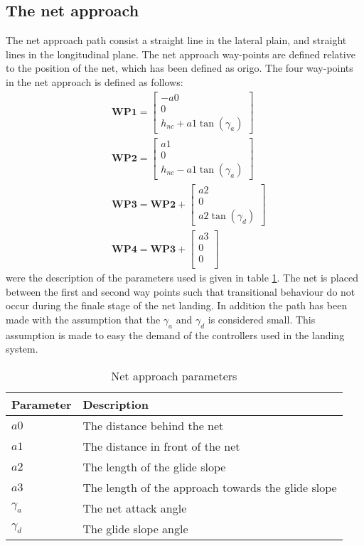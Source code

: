\subsection{The net approach}
The net approach path consist a straight line in the lateral plain, and straight lines in the longitudinal plane. The net approach way-points are defined relative to the position of the net, which has been defined as origo. The four way-points in the net approach is defined as follows:
\begin{subequations}
\begin{align}
&\mathbf{WP1} = 
\begin{bmatrix}
-a0 \\
0 \\
h_{nc} + a1\tan(\gamma_a) 
\end{bmatrix}\\
&\mathbf{WP2} = 
\begin{bmatrix}
a1 \\
0 \\
h_{nc} - a1\tan(\gamma_a)
\end{bmatrix}\\
&\mathbf{WP3} = \mathbf{WP2} + 
\begin{bmatrix}
a2 \\
0 \\
a2\tan(\gamma_d)
\end{bmatrix}\\
&\mathbf{WP4} = \mathbf{WP3} + 
\begin{bmatrix}
a3 \\
0 \\
0 \\
\end{bmatrix}
\end{align}
\end{subequations}
were the description of the parameters used is given in table \ref{Tb:Approach Parameters}. The net is placed between the first and second way points such that transitional behaviour do not occur during the finale stage of the net landing. In addition the path has been made with the assumption that the $\gamma_a$ and $\gamma_d$ is considered small. This assumption is made to easy the demand of the controllers used in the landing system.
\begin{table}[H]
\begin{center}
    \begin{tabular}{ | l | l |}
    \hline
    \textbf{Parameter} & \textbf{Description} \\ \hline
    $a0$ & The distance behind the net \\ \hline
    $a1$ & The distance in front of the net \\ \hline
    $a2$ & The length of the glide slope \\ \hline
    $a3$ & The length of the approach towards the glide slope \\ \hline
    $\gamma_a$ & The net attack angle \\ \hline
    $\gamma_d$ & The glide slope angle \\ \hline
    \end{tabular}
\end{center}
\caption{Net approach parameters }
\label{Tb:Approach Parameters}
\end{table}

